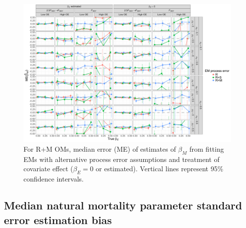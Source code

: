 \documentclass[
  12pt,
]{article}
\begin{document}
\begin{landscape}
\begin{figure}
\begin{center}
\includegraphics[height = \textheight]{beta_M_bias_RMom}
\end{center}
\caption{For R+M OMs, median error (ME) of estimates of $\beta_M$ from fitting EMs with alternative process error assumptions and treatment of covariate effect ($\beta_E = 0$ or estimated). Vertical lines represent 95\% confidence intervals.}\label{beta_M_bias_RMom}
\end{figure}
\end{landscape}

\hypertarget{median-natural-mortality-parameter-standard-error-estimation-bias}{%
\subsection*{Median natural mortality parameter standard error estimation bias}\label{median-natural-mortality-parameter-standard-error-estimation-bias}}
\end{document}
